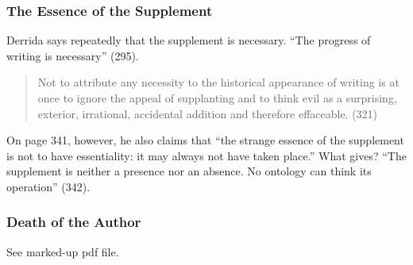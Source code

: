 \documentclass[xcolor=dvipsnames]{beamer}
\begin{document}
\begin{frame}
  \frametitle{The Essence of the Supplement}
  Derrida says repeatedly that the supplement is necessary. ``The
  progress of writing is necessary'' (295). 
  \begin{quote}
    Not to attribute any necessity to the historical appearance of
    writing is at once to ignore the appeal of supplanting and to
    think evil as a surprising, exterior, irrational, accidental
    addition and therefore effaceable. (321)
  \end{quote}
  On page 341, however, he also claims that ``the strange essence of
  the supplement is not to have essentiality: it may always not have
  taken place.'' What gives? ``The supplement is neither a presence
  nor an absence. No ontology can think its operation'' (342).
\end{frame}

\begin{frame}
  \frametitle{Death of the Author}
See marked-up pdf file.  
\end{frame}
\end{document}
